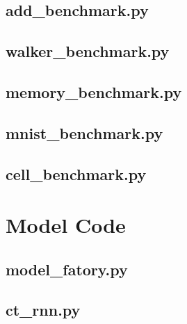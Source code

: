 \documentclass[draft,final]{vutinfth} %
\begin{document}
\subsection{add\_benchmark.py}


\subsection{walker\_benchmark.py}


\subsection{memory\_benchmark.py}


\subsection{mnist\_benchmark.py}


\subsection{cell\_benchmark.py}



\section{Model Code}

\subsection{model\_fatory.py}


\subsection{ct\_rnn.py}

\end{document}
